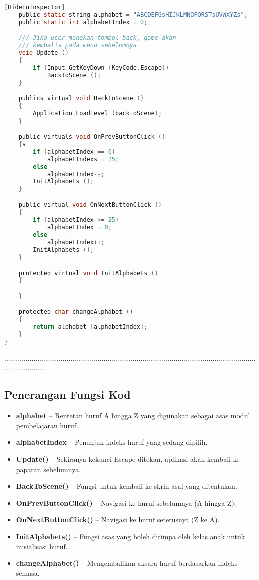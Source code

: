 \begin{itemize}
\begin{itemize}
\begin{itemize}
\begin{itemize}
\begin{itemize}
\begin{itemize}
\begin{itemize}
\begin{itemize}
\begin{flushleft}
\begin{lstlisting}[language=C,caption={Kod Skrip Game Parent bagi AR Alphabets},label={lst:gameparent-script}]
    [HideInInspector]
    public static string alphabet = "ABCDEFGsHIJKLMNOPQRSTsUVWXYZs";
    public static int alphabetIndex = 0;

    /// Jika user menekan tombol back, game akan 
    /// kembalis pada menu sebelumnya
    void Update ()
    {
        if (Input.GetKeyDown (KeyCode.Escape))
            BackToScene ();
    }

    publics virtual void BackToScene ()
    {
        Application.LoadLevel (backtoScene);
    }

    public virtuals void OnPrevButtonClick ()
    {s
        if (alphabetIndex == 0)
            alphabetIndexs = 25;
        else
            alphabetIndex--;
        InitAlphabets ();
    }

    public virtual void OnNextButtonClick ()
    {
        if (alphabetIndex >= 25)
            alphabetIndex = 0;
        else
            alphabetIndex++;
        InitAlphabets ();
    }

    protected virtual void InitAlphabets ()
    {

    }

    protected char changeAlphabet ()
    {
        return alphabet [alphabetIndex];
    }
}
\end{lstlisting}
.....................................................................................................................................................
\subsection*{Penerangan Fungsi Kod}

\begin{itemize}
  \item \textbf{alphabet} -- Rentetan huruf A hingga Z yang digunakan sebagai asas modul pembelajaran huruf.
  \item \textbf{alphabetIndex} -- Penunjuk indeks huruf yang sedang dipilih.
  \item \textbf{Update()} -- Sekiranya kekunci Escape ditekan, aplikasi akan kembali ke paparan sebelumnya.
  \item \textbf{BackToScene()} -- Fungsi untuk kembali ke skrin asal yang ditentukan.
  \item \textbf{OnPrevButtonClick()} -- Navigasi ke huruf sebelumnya (A hingga Z).
  \item \textbf{OnNextButtonClick()} -- Navigasi ke huruf seterusnya (Z ke A).
  \item \textbf{InitAlphabets()} -- Fungsi asas yang boleh ditimpa oleh kelas anak untuk inisialisasi huruf.
  \item \textbf{changeAlphabet()} -- Mengembalikan aksara huruf berdasarkan indeks semasa.
\end{itemize}


\end{flushleft}
\end{itemize}
\end{itemize}
\end{itemize}
\end{itemize}
\end{itemize}
\end{itemize}
\end{itemize}
\end{itemize}

